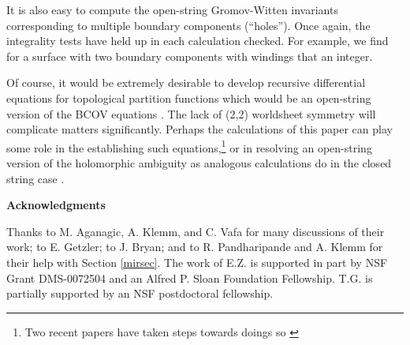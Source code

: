 \documentclass[a4paper,11pt]{article}
\begin{document}
It is also easy to compute the
open-string Gromov-Witten
invariants corresponding to multiple boundary components
(``holes'').  Once again, the integrality tests have
held up in each calculation checked.
For example, we find for a surface with two boundary
components with windings \coordHE{} that
\coordHE{}  \coordHE{} an integer.

Of course, it would be extremely desirable to develop
recursive
differential equations for topological partition functions
which would be an open-string version of the BCOV equations
\cite{BCOV}.
The lack of (2,2) worldsheet symmetry will complicate
matters significantly.
Perhaps the calculations of this paper can
play some role in the establishing
such equations,\footnote{Two recent papers have
taken steps towards doings so \cite{GJS}
\cite{M}} or in
resolving an open-string version
of the holomorphic ambiguity
as analogous calculations
do in the closed string case \cite{KZ}.

\vskip0.2in
\centerline{\bf Acknowledgments}
\vskip0.1in
Thanks to M. Aganagic, A. Klemm, and C. Vafa for
many discussions of their work; to E. Getzler; to J. Bryan;
and to R. Pandharipande
and A. Klemm for their help with Section \ref{mirsec}.
The work of E.Z.
is supported in part by NSF Grant DMS-0072504 and
an Alfred P. Sloan Foundation Fellowship. T.G. is
partially supported by an NSF postdoctoral fellowship.
\end{document}
